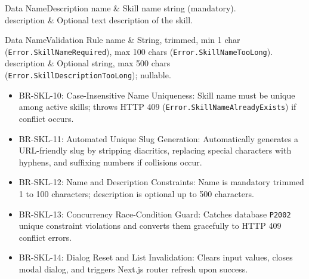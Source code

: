 
\begin{specdatatable}{Data Name}{Description}
name & Skill name string (mandatory).\\ \hline
description & Optional text description of the skill.\\ \hline
\end{specdatatable}

\begin{specdatatable}{Data Name}{Validation Rule}
name & String, trimmed, min 1 char (\texttt{Error.SkillNameRequired}), max 100 chars (\texttt{Error.SkillNameTooLong}).\\ \hline
description & Optional string, max 500 chars (\texttt{Error.SkillDescriptionTooLong}); nullable.\\ \hline
\end{specdatatable}

\begin{itemize}[leftmargin=1.6em,topsep=3pt,itemsep=2pt,parsep=0pt,label=$\bullet$]\brrulelist
    \item BR-SKL-10: Case-Insensitive Name Uniqueness: Skill name must be unique among active skills; throws HTTP 409 (\texttt{Error.SkillNameAlreadyExists}) if conflict occurs.
    \item BR-SKL-11: Automated Unique Slug Generation: Automatically generates a URL-friendly slug by stripping diacritics, replacing special characters with hyphens, and suffixing numbers if collisions occur.
    \item BR-SKL-12: Name and Description Constraints: Name is mandatory trimmed 1 to 100 characters; description is optional up to 500 characters.
    \item BR-SKL-13: Concurrency Race-Condition Guard: Catches database \texttt{P2002} unique constraint violations and converts them gracefully to HTTP 409 conflict errors.
    \item BR-SKL-14: Dialog Reset and List Invalidation: Clears input values, closes modal dialog, and triggers Next.js router refresh upon success.
\end{itemize}

